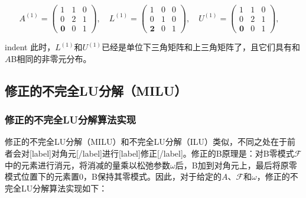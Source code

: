 \documentclass[UTF8,nofonts]{ctexart}
\begin{document}
\[
A^{(1)}=\begin{pmatrix}1 & 1 & 0 \\ 0 & 2 & 1 \\ \boldsymbol{0} & 0 & 1\end{pmatrix},\quad
L^{(1)}=\begin{pmatrix}1 & 0 & 0 \\ 0 & 1 & 0 \\ \boldsymbol{2} & 0 & 1\end{pmatrix},\quad
U^{(1)}=\begin{pmatrix}1 & 1 & 0 \\ 0 & 2 & 1 \\ \boldsymbol{0} & 0 & 1\end{pmatrix},\quad
\]

indent 此时，$L^{(1)}$和$U^{(1)}$已经是单位下三角矩阵和上三角矩阵了，且它们具有和$A$B相同的非零元分布。

\subsection*{修正的不完全LU分解（MILU）}

\subsubsection*{修正的不完全LU分解算法实现}

修正的不完全LU分解（MILU）和不完全LU分解（ILU）类似，不同之处在于前者会对[label]对角元[/label]进行[label]修正[/label]。修正的B原理是：对B零模式$\mathcal{F}$中的元素进行消元，将消减的量乘以松弛参数$\omega$后，B加到对角元上，最后将原零模式位置下的元素置$0$，B保持其零模式。因此，对于给定的$A$、$\mathcal{F}$和$\omega$，修正的不完全LU分解算法实现如下：

\begin{algorithm}[H]
\end{algorithm}
\end{document}
